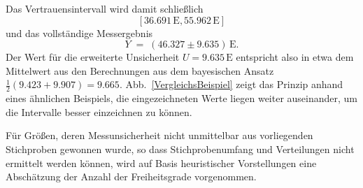 Das Vertrauensintervall wird damit schließlich
$$
[36.691 \, \mathrm{E}, 55.962 \, \mathrm{E}]
$$
und das vollständige Messergebnis
$$
Y \; = \; (46.327 \pm 9.635) \, \mathrm{E} .
$$
Der Wert für die erweiterte Unsicherheit $U = 9.635 \, \mathrm{E}$ entspricht also in etwa
dem Mittelwert aus den Berechnungen aus dem bayesischen Ansatz $\frac{1}{2} (9.423 + 9.907) =  9.665$.
Abb.~\ref{VergleichsBeispiel} zeigt das Prinzip anhand eines ähnlichen Beispiels, die eingezeichneten Werte
liegen weiter auseinander, um die Intervalle besser einzeichnen zu können.



Für Größen, deren Messunsicherheit nicht unmittelbar aus vorliegenden
Stichproben gewonnen wurde, so dass Stichprobenumfang und Verteilungen nicht ermittelt
werden können, wird auf Basis heuristischer Vorstellungen eine Abschätzung der Anzahl der Freiheitsgrade
vorgenommen.

